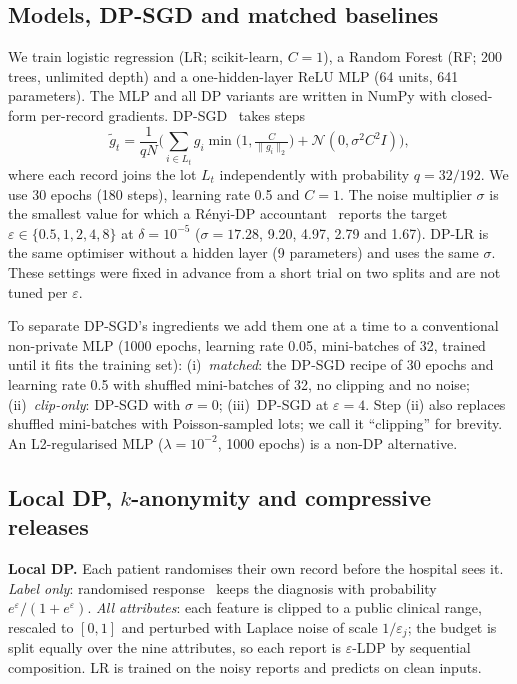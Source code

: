 \documentclass[conference]{IEEEtran}
\newcommand{\eps}{\varepsilon}
\begin{document}
\subsection{Models, DP-SGD and matched baselines}
We train logistic regression (LR; scikit-learn, $C{=}1$), a Random Forest (RF; 200 trees, unlimited depth) and a one-hidden-layer ReLU MLP (64 units, 641 parameters). The MLP and all DP variants are written in NumPy with closed-form per-record gradients. DP-SGD~\cite{abadi2016} takes steps
\begin{equation}
\tilde g_t=\frac{1}{qN}\Big(\sum_{i\in L_t} g_i\min\big(1,\tfrac{C}{\lVert g_i\rVert_2}\big)+\mathcal N(0,\sigma^2C^2 I)\Big),
\end{equation}
where each record joins the lot $L_t$ independently with probability $q{=}32/192$. We use 30 epochs (180 steps), learning rate 0.5 and $C{=}1$. The noise multiplier $\sigma$ is the smallest value for which a R\'enyi-DP accountant~\cite{mironov2017,mironov2019,dpaccounting} reports the target $\eps\in\{0.5,1,2,4,8\}$ at $\delta{=}10^{-5}$ ($\sigma{=}17.28$, 9.20, 4.97, 2.79 and 1.67). DP-LR is the same optimiser without a hidden layer (9 parameters) and uses the same $\sigma$. These settings were fixed in advance from a short trial on two splits and are not tuned per $\eps$.

To separate DP-SGD's ingredients we add them one at a time to a conventional non-private MLP (1000 epochs, learning rate 0.05, mini-batches of 32, trained until it fits the training set): (i)~\emph{matched}: the DP-SGD recipe of 30 epochs and learning rate 0.5 with shuffled mini-batches of 32, no clipping and no noise; (ii)~\emph{clip-only}: DP-SGD with $\sigma{=}0$; (iii)~DP-SGD at $\eps{=}4$. Step (ii) also replaces shuffled mini-batches with Poisson-sampled lots; we call it ``clipping'' for brevity. An L2-regularised MLP ($\lambda{=}10^{-2}$, 1000 epochs) is a non-DP alternative.

\subsection{Local DP, $k$-anonymity and compressive releases}
\textbf{Local DP.} Each patient randomises their own record before the hospital sees it. \emph{Label only}: randomised response~\cite{warner1965} keeps the diagnosis with probability $e^{\eps}/(1+e^{\eps})$. \emph{All attributes}: each feature is clipped to a public clinical range, rescaled to $[0,1]$ and perturbed with Laplace noise of scale $1/\eps_j$; the budget is split equally over the nine attributes, so each report is $\eps$-LDP by sequential composition. LR is trained on the noisy reports and predicts on clean inputs.
\end{document}
